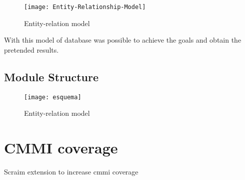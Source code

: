 \begin{figure}[h]
	\begin{center}
		\leavevmode
		\texttt{[image: Entity-Relationship-Model]}
		\caption{Entity-relation model}
		\label{fig:entity-relation}
	\end{center}
\end{figure}

With this model of database was possible to achieve the goals and obtain the pretended results.

\subsection{Module Structure}




\begin{landscape}
\begin{figure}[h]
	\begin{center}
		\leavevmode
		\texttt{[image: esquema]}
		\caption{Entity-relation model}
		\label{fig:esquema}
	\end{center}
\end{figure}
\end{landscape}

\section{CMMI coverage} \label{sec:cmmicoverage}
Scraim extension to increase cmmi coverage

